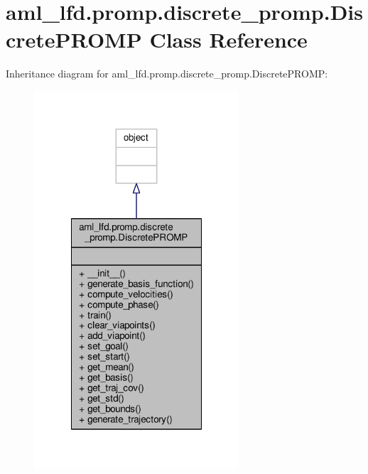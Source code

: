 \hypertarget{classaml__lfd_1_1promp_1_1discrete__promp_1_1_discrete_p_r_o_m_p}{\section{aml\-\_\-lfd.\-promp.\-discrete\-\_\-promp.\-Discrete\-P\-R\-O\-M\-P Class Reference}
\label{classaml__lfd_1_1promp_1_1discrete__promp_1_1_discrete_p_r_o_m_p}
}


Inheritance diagram for aml\-\_\-lfd.\-promp.\-discrete\-\_\-promp.\-Discrete\-P\-R\-O\-M\-P\-:
\nopagebreak
\begin{figure}[H]
\begin{center}
\leavevmode
\includegraphics[width=216pt]{classaml__lfd_1_1promp_1_1discrete__promp_1_1_discrete_p_r_o_m_p__inherit__graph}
\end{center}
\end{figure}



